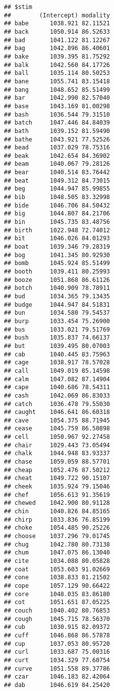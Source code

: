 \documentclass[
]{article}
\begin{document}
\begin{verbatim}
## $stim
##        (Intercept) modality
## babe      1038.921 82.11521
## back      1050.914 86.52633
## bad       1041.122 81.12267
## bag       1042.896 86.40601
## bake      1039.395 81.75292
## balk      1042.560 84.17726
## ball      1035.114 80.50253
## bane      1055.741 83.15418
## bang      1048.652 85.51499
## bar       1042.990 82.57040
## base      1043.169 81.00298
## bash      1036.544 79.31510
## batch     1047.446 84.84039
## bath      1039.152 81.59490
## bathe     1043.921 77.52526
## bead      1037.029 78.75316
## beak      1042.654 84.36902
## beam      1040.067 79.28126
## bear      1040.514 83.76442
## beat      1049.312 84.73015
## beg       1044.947 85.99855
## bib       1048.505 83.32998
## bide      1046.706 84.50432
## big       1044.807 84.21706
## bin       1045.735 83.48756
## birth     1022.948 72.74012
## bit       1046.026 84.01293
## boat      1039.346 79.28319
## bog       1041.345 80.92930
## bomb      1045.924 85.51499
## booth     1039.411 80.25993
## booze     1051.868 86.61126
## botch     1040.909 78.78911
## bud       1034.365 79.13435
## budge     1044.947 84.51831
## bun       1034.580 79.54537
## burp      1033.454 75.26900
## bus       1033.021 79.51769
## bush      1035.837 74.66137
## but       1039.495 80.07003
## cab       1040.445 83.75963
## cage      1038.917 78.57028
## call      1049.019 85.14598
## calm      1047.082 87.14904
## cape      1040.686 78.54311
## cash      1042.069 86.83033
## catch     1036.478 79.55030
## caught    1046.641 86.60318
## cave      1054.375 88.71945
## cease     1045.759 86.50898
## cell      1050.967 92.27458
## chair     1029.443 73.05494
## chalk     1044.948 83.93337
## chase     1059.059 88.57701
## cheap     1052.476 87.50212
## cheat     1049.722 90.15107
## cheek     1035.924 79.15046
## chef      1056.613 91.35619
## chewed    1042.900 80.91128
## chin      1040.826 84.85165
## chirp     1033.836 76.85199
## choke     1054.485 90.25226
## choose    1037.296 79.01745
## chug      1042.780 80.73138
## chum      1047.075 86.13040
## cite      1034.088 80.05828
## coat      1053.603 91.02669
## cone      1038.833 81.21502
## cope      1057.129 90.66422
## core      1048.035 83.86180
## cot       1051.651 87.05225
## couch     1040.402 80.76853
## cough     1045.715 78.56370
## cub       1030.915 82.09372
## cuff      1046.868 86.57878
## cup       1037.053 80.95720
## curl      1033.687 75.00316
## curt      1034.329 77.60754
## curve     1051.558 89.37786
## czar      1046.183 82.42064
## dab       1046.619 84.25420

\end{verbatim}
\end{document}

